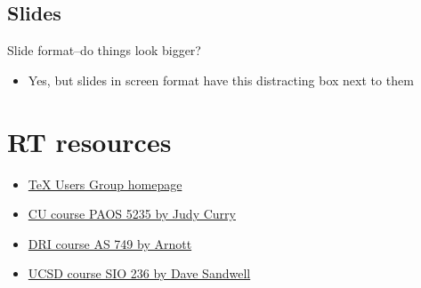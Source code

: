 \documentclass[12pt]{article}
\begin{document}
\begin{slide}
\section[Slides]{Slides}
Slide format--do things look bigger?
\begin{itemize}
\item Yes, but slides in screen format have this distracting box next
to them
\end{itemize}
\end{slide}
\vfill

\section[Resources]{RT resources}
\begin{itemize}
\item \href{http://www.tug.org}{\TeX{} Users Group homepage}
\item \href{http://paos.colorado.edu/5235/frames/index.html}{CU course
PAOS 5235 by Judy Curry}
\item \href{http://www.dri.edu/GradPrograms/ASC/CourseInfo/Atms749/index.html}{DRI course AS 749 by Arnott}
\item \href{http://topex.ucsd.edu/rs}{UCSD course SIO 236 by Dave Sandwell}
\end{itemize}
\vfill
\end{document}
